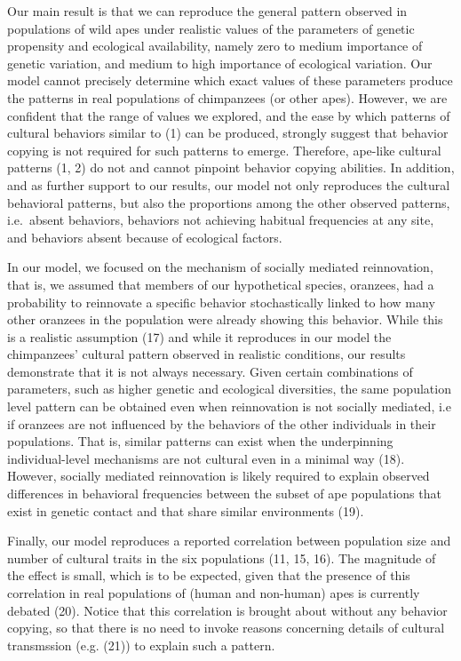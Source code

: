 \documentclass[9pt,twocolumn,twoside,]{pnas-new}
\begin{document}
Our main result is that we can reproduce the general pattern observed in
populations of wild apes under realistic values of the parameters of
genetic propensity and ecological availability, namely zero to medium
importance of genetic variation, and medium to high importance of
ecological variation. Our model cannot precisely determine which exact
values of these parameters produce the patterns in real populations of
chimpanzees (or other apes). However, we are confident that the range of
values we explored, and the ease by which patterns of cultural behaviors
similar to (1) can be produced, strongly suggest that behavior copying
is not required for such patterns to emerge. Therefore, ape-like
cultural patterns (1, 2) do not and cannot pinpoint behavior copying
abilities. In addition, and as further support to our results, our model
not only reproduces the cultural behavioral patterns, but also the
proportions among the other observed patterns, i.e.~absent behaviors,
behaviors not achieving habitual frequencies at any site, and behaviors
absent because of ecological factors.

In our model, we focused on the mechanism of socially mediated
reinnovation, that is, we assumed that members of our hypothetical
species, oranzees, had a probability to reinnovate a specific behavior
stochastically linked to how many other oranzees in the population were
already showing this behavior. While this is a realistic assumption (17)
and while it reproduces in our model the chimpanzees' cultural pattern
observed in realistic conditions, our results demonstrate that it is not
always necessary. Given certain combinations of parameters, such as
higher genetic and ecological diversities, the same population level
pattern can be obtained even when reinnovation is not socially mediated,
i.e if oranzees are not influenced by the behaviors of the other
individuals in their populations. That is, similar patterns can exist
when the underpinning individual-level mechanisms are not cultural even
in a minimal way (18). However, socially mediated reinnovation is likely
required to explain observed differences in behavioral frequencies
between the subset of ape populations that exist in genetic contact and
that share similar environments (19).

Finally, our model reproduces a reported correlation between population
size and number of cultural traits in the six populations (11, 15, 16).
The magnitude of the effect is small, which is to be expected, given
that the presence of this correlation in real populations of (human and
non-human) apes is currently debated (20). Notice that this correlation
is brought about without any behavior copying, so that there is no need
to invoke reasons concerning details of cultural transmssion (e.g. (21))
to explain such a pattern.
\end{document}
